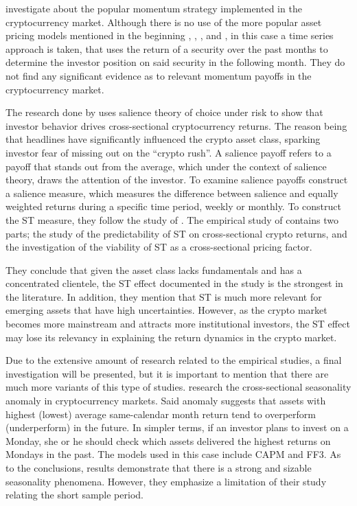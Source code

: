 \parencite{GROBYS20196} investigate about the popular momentum strategy implemented in the cryptocurrency market. Although there is no use of the more popular asset pricing models mentioned in the beginning \parencite{sharpe1964}, \parencite{fama1993}, \parencite{fama2015}, and \parencite{carhart1997}, in this case a time series approach is taken, that uses the return of a security over the past months to determine the investor position on said security in the following month. They do not find any significant evidence as to relevant momentum payoffs in the cryptocurrency market.

The research done by \parencite{CAI2024107052} uses salience theory of choice under risk to show that investor behavior drives cross-sectional cryptocurrency returns. The reason being that headlines have significantly influenced the crypto asset class, sparking investor fear of missing out on the ``crypto rush''. A salience payoff refers to a payoff that stands out from the average, which under the context of salience theory, draws the attention of the investor. To examine salience payoffs \parencite{CAI2024107052} construct a salience measure, which measures the difference between salience and equally weighted returns during a specific time period, weekly or monthly. To construct the ST measure, they follow the study of \parencite{COSEMANS2021460}. The empirical study of \parencite{CAI2024107052} contains two parts; the study of the predictability of ST on cross-sectional crypto returns, and the investigation of the viability of ST as a cross-sectional pricing factor. 

They conclude that given the asset class lacks fundamentals and has a concentrated clientele, the ST effect documented in the study is the strongest in the literature. In addition, they mention that ST is much more relevant for emerging assets that have high uncertainties. However, as the crypto market becomes more mainstream and attracts more institutional investors, the ST effect may lose its relevancy in explaining the return dynamics in the crypto market.  

Due to the extensive amount of research related to the empirical studies, a final investigation will be presented, but it is important to mention that there are much more variants of this type of studies. \parencite{Long2020} research the cross-sectional seasonality anomaly in cryptocurrency markets. Said anomaly suggests that assets with highest (lowest) average same-calendar month return tend to overperform (underperform) in the future. In simpler terms, if an investor plans to invest on a Monday, she or he should check which assets delivered the highest returns on Mondays in the past. The models used in this case include CAPM and FF3. As to the conclusions, results demonstrate that there is a strong and sizable seasonality phenomena. However, they emphasize a limitation of their study relating the short sample period.

